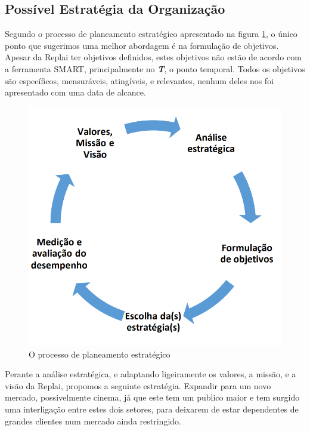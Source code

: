 \newpage
\subsection{Possível Estratégia da Organização}
Segundo o processo de planeamento estratégico apresentado na figura \ref{fig:planeamento}, o único ponto que sugerimos uma melhor abordagem é na formulação de objetivos. Apesar da Replai ter objetivos definidos, estes objetivos não estão de acordo com a ferramenta SMART, principalmente no \textit{\textbf{T}}, o ponto temporal. Todos os objetivos são específicos, mensuráveis, atingíveis, e relevantes, nenhum deles nos foi apresentado com uma data de alcance.

\begin{figure}[ht]
    \centering
    \includegraphics[scale=0.5]{images/planeamento.png}
    \caption{O processo de planeamento estratégico}
    \label{fig:planeamento}
\end{figure}


Perante a análise estratégica, e adaptando ligeiramente os valores, a missão, e a visão da Replai, propomos a seguinte estratégia. Expandir para um novo mercado, possivelmente cinema, já que este tem um publico maior e tem surgido uma interligação entre estes dois setores, para deixarem de estar dependentes de grandes clientes num mercado ainda restringido.


